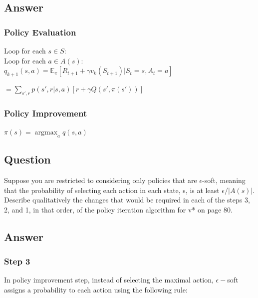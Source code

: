 \documentclass[11pt]{article}
\DeclareMathOperator*{\argmax}{argmax}
\begin{document}
    \subsection*{Answer}

    \subsubsection*{Policy Evaluation}
    Loop for each $ s \in S $: \\

    \hspace{4mm} Loop for each $ a \in A(s) $: \\

    \hspace{6mm} $q_{k+1}(s, a) = \mathbb{E}_{\pi}[R_{t+1}+\gamma v_k(S_{t+1})|S_t=s,A_t=a]$
    
    \hspace{6mm} $= \sum_{s',r} p(s',r| s, a) [ r + \gamma Q(s', \pi(s'))  ] $

    \subsubsection*{Policy Improvement}
    \hspace{4mm} $ \pi(s) = \argmax_{a} q(s, a) $

    \subsection{Question}

    Suppose you are restricted to considering only policies that are $\epsilon$-soft, meaning that the probability of selecting each action in each state, s, is at least $\epsilon/|A(s)|$.
    Describe qualitatively the changes that would be required in each of the steps 3, 2, and 1, in that order, of the policy iteration algorithm for v* on page 80.

    \subsection*{Answer}

    \subsubsection*{Step 3}

    In policy improvement step, instead of selecting the maximal action, $ \epsilon-$soft assigns a probability to each action using the following rule:
\end{document}
